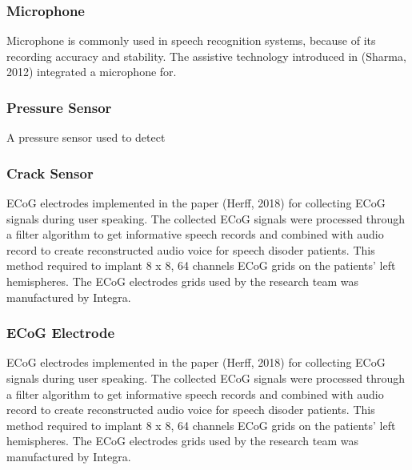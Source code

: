 \subsubsection{Microphone}
Microphone is commonly used in speech recognition systems, because of its recording accuracy and stability. The assistive technology introduced in (Sharma, 2012) integrated a microphone for.

\subsubsection{Pressure Sensor}
A pressure sensor used to detect 

\subsubsection{Crack Sensor}
ECoG electrodes implemented in the paper (Herff, 2018) for collecting ECoG signals during user speaking. The collected ECoG signals were processed through a filter algorithm to get informative speech records and combined with audio record to create reconstructed audio voice for speech disoder patients. This method required to implant 8 x 8, 64 channels ECoG grids on the patients' left hemispheres. The ECoG electrodes grids used by the research team was manufactured by Integra.

\subsubsection{ECoG Electrode}
ECoG electrodes implemented in the paper (Herff, 2018) for collecting ECoG signals during user speaking. The collected ECoG signals were processed through a filter algorithm to get informative speech records and combined with audio record to create reconstructed audio voice for speech disoder patients. This method required to implant 8 x 8, 64 channels ECoG grids on the patients' left hemispheres. The ECoG electrodes grids used by the research team was manufactured by Integra.